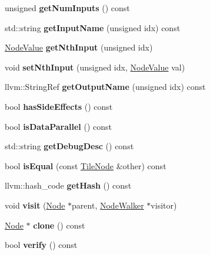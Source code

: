 \begin{DoxyCompactItemize}
unsigned {\bfseries get\+Num\+Inputs} () const
\item 
\mbox{\label{classglow_1_1_tile_node_a265e3bed87ec59ef3834c51b2abb85cd}} 
std\+::string {\bfseries get\+Input\+Name} (unsigned idx) const
\item 
\mbox{\label{classglow_1_1_tile_node_a560fa22d32ffe9e00d384046b1112041}} 
\hyperlink{structglow_1_1_node_value}{Node\+Value} {\bfseries get\+Nth\+Input} (unsigned idx)
\item 
\mbox{\label{classglow_1_1_tile_node_a84fc324691d3d1024f91dddd762279e3}} 
void {\bfseries set\+Nth\+Input} (unsigned idx, \hyperlink{structglow_1_1_node_value}{Node\+Value} val)
\item 
\mbox{\label{classglow_1_1_tile_node_a63b466280f01e5fe2ca9dc849690c832}} 
llvm\+::\+String\+Ref {\bfseries get\+Output\+Name} (unsigned idx) const
\item 
\mbox{\label{classglow_1_1_tile_node_a6085f0103b5a555509af6d13003ddb6f}} 
bool {\bfseries has\+Side\+Effects} () const
\item 
\mbox{\label{classglow_1_1_tile_node_a735a0a9ade64f954ca6213aa8bb62fea}} 
bool {\bfseries is\+Data\+Parallel} () const
\item 
\mbox{\label{classglow_1_1_tile_node_afe05308c2b3973afac8b9edca7bb52d4}} 
std\+::string {\bfseries get\+Debug\+Desc} () const
\item 
\mbox{\label{classglow_1_1_tile_node_a6176bdaaa75e697c1b2dbe45b5e109e8}} 
bool {\bfseries is\+Equal} (const \hyperlink{classglow_1_1_tile_node}{Tile\+Node} \&other) const
\item 
\mbox{\label{classglow_1_1_tile_node_a72a5028fc517b2b98f5b735146793dfa}} 
llvm\+::hash\+\_\+code {\bfseries get\+Hash} () const
\item 
\mbox{\label{classglow_1_1_tile_node_a3c67396ded3b398711a7e8ff6fc715c4}} 
void {\bfseries visit} (\hyperlink{classglow_1_1_node}{Node} $\ast$parent, \hyperlink{classglow_1_1_node_walker}{Node\+Walker} $\ast$visitor)
\item 
\mbox{\label{classglow_1_1_tile_node_a9436394e1c5658223b3d2ec45ff4aade}} 
\hyperlink{classglow_1_1_node}{Node} $\ast$ {\bfseries clone} () const
\item 
\mbox{\label{classglow_1_1_tile_node_a38e57dc5e72e655e715fe22d42264ba4}} 
bool {\bfseries verify} () const
\end{DoxyCompactItemize}
